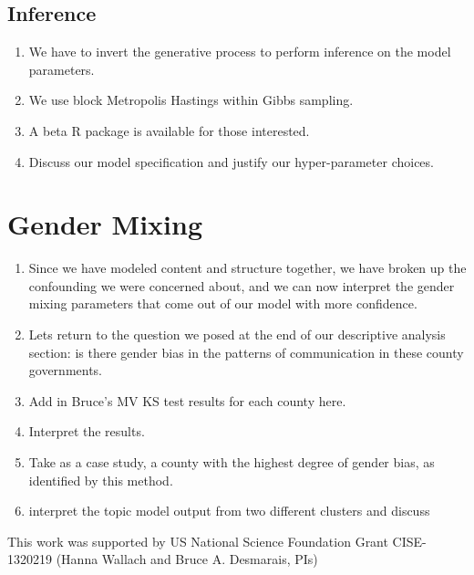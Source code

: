 \documentclass{pnastwo}
\begin{document}
\begin{article}
\subsection{Inference}
\begin{enumerate}
	\item We have to invert the generative process to perform inference on the model parameters.
	\item We use block Metropolis Hastings within Gibbs sampling.
	\item A beta R package is available for those interested.
	\item Discuss our model specification and justify our hyper-parameter choices.
\end{enumerate}

\section{Gender Mixing}

\begin{enumerate}
	\item Since we have modeled content and structure together, we have broken up the confounding we were concerned about, and we can now interpret the gender mixing parameters that come out of our model with more confidence.
	
	\item Lets return to the question we posed at the end of our descriptive analysis section: is there gender bias in the patterns of communication in these county governments. 
	
	\item Add in Bruce's MV KS test results for each county here.
	
	\item Interpret the results.
	
	\item Take as a case study, a county with the highest degree of gender bias, as identified by this method.
	
	\item interpret the topic model output from two different clusters and discuss
	
	
\end{enumerate}






\begin{acknowledgments}
This work was supported by US National Science Foundation Grant CISE-1320219 (Hanna Wallach and Bruce A. Desmarais, PIs)
\vspace{-.5cm}
\end{acknowledgments}




\end{article}
\end{document}
